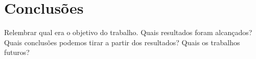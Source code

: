 \section{Conclusões}
Relembrar qual era o objetivo do trabalho.
Quais resultados foram alcançados?
Quais conclusões podemos tirar a partir dos resultados?
Quais os trabalhos futuros?